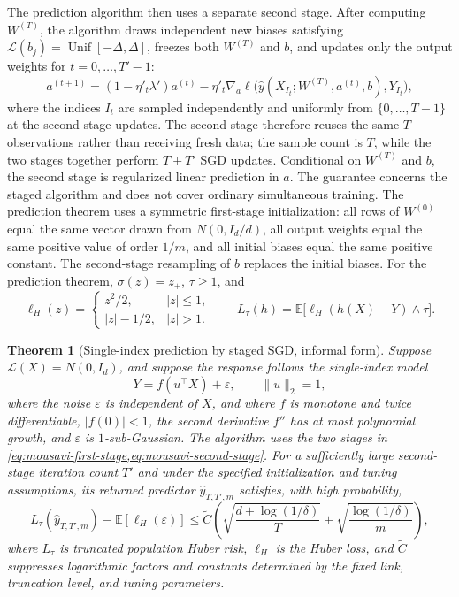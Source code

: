 \documentclass[11pt,twoside]{article}
\newcommand{\E}{\mathbb E}
\newcommand{\Law}{\mathcal L}
\newtheorem{theorem}{Theorem}[section]
\theoremstyle{definition}
\theoremstyle{remark}
\begin{document}
The prediction algorithm then uses a separate second stage. After computing
$W^{(T)}$, the algorithm draws independent new biases satisfying
$\Law(b_j)=\operatorname{Unif}[-\Delta,\Delta]$, freezes both $W^{(T)}$ and $b$,
and updates only the output weights for $t=0,\ldots,T'-1$:
\begin{equation}
 a^{(t+1)}=(1-\eta'_t\lambda')a^{(t)}
 -\eta'_t\nabla_a\ell\bigl(
   \widehat y(X_{I_t};W^{(T)},a^{(t)},b),Y_{I_t}\bigr),
 \label{eq:mousavi-second-stage}
\end{equation}
where the indices $I_t$ are sampled independently and uniformly from
$\{0,\ldots,T-1\}$ at the second-stage updates. The second stage
therefore reuses the same $T$ observations rather than receiving fresh data;
the sample count is $T$, while the two stages together perform $T+T'$ SGD
updates. Conditional on $W^{(T)}$ and $b$, the second stage is regularized
linear prediction in $a$. The guarantee concerns the staged algorithm and
does not cover ordinary simultaneous training.
The prediction theorem uses a symmetric first-stage
initialization: all rows of $W^{(0)}$ equal the same vector drawn from
$N(0,I_d/d)$, all output weights equal the same positive value of order
$1/m$, and all initial biases equal the same positive constant. The
second-stage resampling of $b$ replaces the initial biases. For the prediction theorem,
$\sigma(z)=z_+$, $\tau\geq1$, and
\begin{equation}
 \ell_H(z)=
 \begin{cases}
  z^2/2,& |z|\leq1,\\
  |z|-1/2,& |z|>1.
 \end{cases}
 \qquad
 L_\tau(h)=\E\bigl[\ell_H(h(X)-Y)\wedge\tau\bigr].
 \label{eq:huber-truncated-risk}
\end{equation}
\begin{theorem}[Single-index prediction by staged SGD, informal form]
Suppose \(\Law(X)=N(0,I_d)\), and suppose the response follows the single-index
model
\begin{equation}
 Y=f(u^\top X)+\varepsilon,
 \qquad \|u\|_2=1,
 \label{eq:single-index-model}
\end{equation}
where the noise \(\varepsilon\) is independent of \(X\), and where $f$ is
monotone and twice differentiable, $|f(0)|<1$, the second derivative $f''$ has
at most polynomial growth, and \(\varepsilon\) is $1$-sub-Gaussian. The
algorithm uses the two stages in \cref{eq:mousavi-first-stage,eq:mousavi-second-stage}.
For a sufficiently large second-stage iteration count $T'$ and under the
specified initialization and tuning assumptions, its returned predictor
$\widehat y_{T,T',m}$ satisfies, with high probability,
\begin{equation}
 L_\tau(\widehat y_{T,T',m})-\E[\ell_H(\varepsilon)]
 \leq \widetilde C\left(
       \sqrt{\frac{d+\log(1/\delta)}{T}}
       +\sqrt{\frac{\log(1/\delta)}{m}}\right),
 \label{eq:mousavi-risk}
\end{equation}
where $L_\tau$ is truncated population Huber risk, $\ell_H$ is the Huber
loss, and $\widetilde C$ suppresses logarithmic factors and constants
determined by the fixed link, truncation level, and tuning parameters.
\end{theorem}
\end{document}
